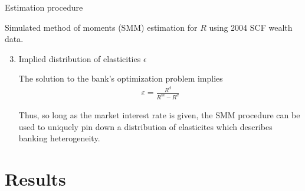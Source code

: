 \documentclass{beamer}
\begin{document}
\begin{frame}{Estimation procedure}

Simulated method of moments (SMM) estimation for $R$ using 2004 SCF wealth data.

\begin{enumerate}
  \setcounter{enumi}{2} 
\item Implied distribution of elasticities $\epsilon$
  \par The solution to the bank's optimization problem implies
  \begin{align}
    \varepsilon = \frac{R^d}{R^m - R^d}
  \end{align}

  \par Thus, so long as the market interest rate is given, the SMM procedure can be used to uniquely pin down a distribution of elasticites which describes banking heterogeneity.
  \end{enumerate}

\end{frame}

\section{Results}
\end{document}
